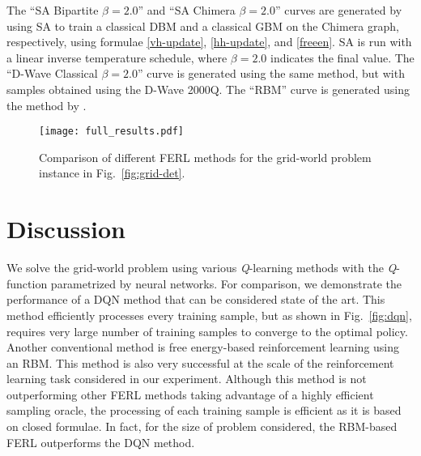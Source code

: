 \documentclass[pra,twocolumn,floatfix,superscriptaddress]{revtex4}
\begin{document}
The ``SA Bipartite $\beta = 2.0$'' and ``SA Chimera $\beta = 2.0$'' curves are generated by using SA to train a classical DBM and a classical GBM on the Chimera graph, respectively, using formulae \eqref{vh-update}, \eqref{hh-update}, and \eqref{freeen}. SA is run with a linear inverse temperature schedule, where $\beta = 2.0$ indicates the final value. The ``D-Wave Classical $\beta = 2.0$'' curve is generated using the same method, but with samples obtained using the D-Wave 2000Q. The ``RBM'' curve is generated using the method by \cite{hintonRBM}.

\begin{figure}
  \centering
         \texttt{[image: full\_results.pdf]}
  \caption{\footnotesize{Comparison of different FERL methods for the grid-world problem instance in Fig.~\ref{fig:grid-det}.}}
  \label{fig:ferl-comparison}
\end{figure}


\section{Discussion} 

We solve the grid-world problem using various \emph{Q}-learning methods with the \emph{Q}-function parametrized by neural networks. For comparison, we demonstrate the performance of a DQN method that can be considered  state of the art. This method efficiently processes every training sample, but as shown in Fig.~\ref{fig:dqn}, requires very large number of training samples to converge to the optimal policy.  
Another conventional method is free energy-based reinforcement learning using an RBM. This method is also very successful at the scale of the reinforcement learning task considered in our experiment. Although this method is not outperforming other FERL methods taking advantage of a highly efficient sampling oracle,  the processing of each training sample is efficient as it is based on closed formulae. In fact, for the size of problem considered, the RBM-based FERL outperforms the DQN method.   
\end{document}
